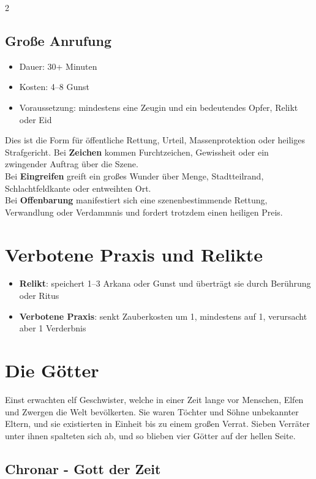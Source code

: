 \begin{multicols*}{2}
\subsection{Große Anrufung}
\begin{itemize}[leftmargin=*]
\item Dauer: 30+ Minuten
\item Kosten: 4--8 Gunst
\item Voraussetzung: mindestens eine Zeugin und ein bedeutendes Opfer, Relikt oder Eid
\end{itemize}
Dies ist die Form für öffentliche Rettung, Urteil, Massenprotektion oder heiliges Strafgericht.
Bei \textbf{Zeichen} kommen Furchtzeichen, Gewissheit oder ein zwingender Auftrag über die Szene.\\
Bei \textbf{Eingreifen} greift ein großes Wunder über Menge, Stadtteilrand, Schlachtfeldkante oder entweihten Ort.\\
Bei \textbf{Offenbarung} manifestiert sich eine szenenbestimmende Rettung, Verwandlung oder Verdammnis und fordert trotzdem einen heiligen Preis.

\section{Verbotene Praxis und Relikte}
\begin{itemize}[leftmargin=*]
\item \textbf{Relikt}: speichert 1--3 Arkana oder Gunst und überträgt sie durch Berührung oder Ritus
\item \textbf{Verbotene Praxis}: senkt Zauberkosten um 1, mindestens auf 1, verursacht aber 1 Verderbnis
\end{itemize}

\section{Die Götter}\label{sec:die-gotter}

Einst erwachten elf Geschwister, welche in einer Zeit lange vor Menschen, Elfen und Zwergen die Welt bevölkerten.
Sie waren Töchter und Söhne unbekannter Eltern, und sie existierten in Einheit bis zu einem großen Verrat.
Sieben Verräter unter ihnen spalteten sich ab, und so blieben vier Götter auf der hellen Seite.

\subsection{Chronar - Gott der Zeit}\label{subsec:chronar-gott-der-zeit}


\end{multicols*}
